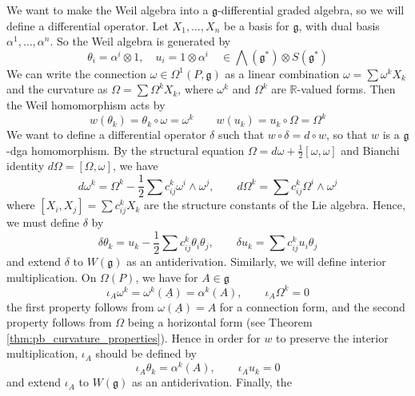 We want to make the Weil algebra into a $\mathfrak{g}$-differential graded
algebra, so we will define a differential operator. Let $X_1,\ldots,X_n$ be a basis
for $\mathfrak{g}$, with dual basis  $\alpha^1,\ldots,\alpha^n$. So the Weil
algebra is generated by 
\begin{equation} \label{eq:weil_basis}
	 \theta_i = \alpha^i \otimes 1, \quad 
	 u_i = 1\otimes \alpha^i \quad\in \bigwedge(\mathfrak{g}^*)\otimes S(\mathfrak{g}^*)
\end{equation}
We can write the connection $\omega\in\Omega^1(P,\mathfrak{g})$ as a linear
combination $\omega = \sum \omega^kX_k$ and the curvature as $\Omega=\sum \Omega^kX_k$,
where  $\omega^k$ and  $\Omega^k$ are  $\mathbb{R}$-valued forms. 
Then the Weil homomorphism acts by 
\begin{equation} \label{eq:weil_homo}
w(\theta_k) = \theta_k\circ \omega = \omega^k
\qquad 
w(u_k) = u_k\circ \Omega = \Omega^k
\end{equation}
We want to define a differential operator $\delta$ such that  $w\circ \delta =
d\circ w$, so that $w$ is a  $\mathfrak{g}$-dga homomorphism. By the 
structural equation $\Omega=d\omega + \frac{1}{2}[\omega,\omega]$ and 
Bianchi identity $d\Omega=[\Omega,\omega]$, we have
\[
d\omega^k = \Omega^k - \frac{1}{2}\sum c_{ij}^k \omega^i\wedge \omega^j,
\qquad 
d\Omega^k = \sum c_{ij}^k \Omega^i\wedge \omega^j
\] 
where $[X_i,X_j]=\sum c_{ij}^kX_k$ are the structure constants of the Lie
algebra. Hence, we must define $\delta$ by
\begin{equation} \label{eq:weil_differential}
\delta\theta_k = u_k - \frac{1}{2}\sum c_{ij}^k \theta_i\theta_j, \qquad
\delta u_k = \sum c_{ij}^k u_i\theta_j
\end{equation}
and extend $\delta$ to  $W(\mathfrak{g})$ as an antiderivation. 
Similarly, we will define interior multiplication. On $\Omega(P)$, we have
for $A\in\mathfrak{g}$
\[
	 \iota_A \omega^k = \omega^k(\underline{A}) = \alpha^k(A), \qquad 
	 \iota_A \Omega^k = 0
\] 
the first property follows from $\omega(\underline{A})=A$ for a connection form,
and the second property follows from $\Omega$ being a horizontal form (see Theorem
\ref{thm:pb_curvature_properties}). Hence in order for $w$ to preserve the
interior multiplication,  $\iota_A$ should be defined by
\begin{equation} \label{eq:weil_interior}
\iota_A \theta_k = \alpha^k(A), \qquad \iota_A u_k = 0
\end{equation}
and extend $\iota_A$ to  $W(\mathfrak{g})$ as an antiderivation. Finally, the
